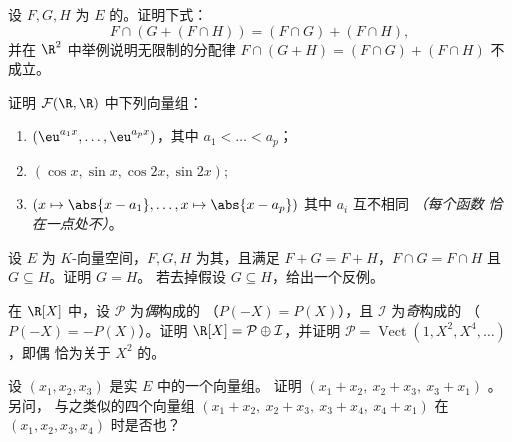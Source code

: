 \begin{exercise}[$\star\star$]\label{exo:b1:vspaces:7}
设 $F, G, H$ 为 $E$ 的。证明下式：
\[
F \cap (G + (F \cap H)) = (F \cap G) + (F \cap H),
\]
并在 $\R^2$ 中举例说明无限制的分配律
$F \cap (G + H) = (F\cap G) + (F \cap H)$ 不成立。
\end{exercise}

\begin{exercise}[$\star\star\star$]\label{exo:b1:vspaces:8}
证明 $\mathcal{F}(\R, \R)$ 中下列向量组：
\begin{enumerate}
  \item $(\eu^{a_1 x}, \dots, \eu^{a_p x})$，其中 $a_1 < \dots < a_p$；
  \item $(\cos x, \sin x, \cos 2x, \sin 2x)$;
  \item $(x \mapsto \abs{x - a_1}, \dots, x \mapsto \abs{x - a_p})$
        其中 $a_i$ 互不相同 \emph{（每个函数
        恰在一点处不）}。
\end{enumerate}
\end{exercise}

\begin{exercise}[$\star\star\star$]\label{exo:b1:vspaces:9}
设 $E$ 为 $K$-向量空间，$F, G, H$ 为其，且满足 $F + G =
F + H$，$F \cap G = F \cap H$ 且 $G \subseteq H$。证明 $G = H$。
若去掉假设 $G \subseteq H$，给出一个反例。
\end{exercise}

\begin{exercise}[$\star\star$]\label{exo:b1:vspaces:10}
在 $\R[X]$ 中，设 $\mathcal P$ 为\emph{偶}构成的
（$P(-X) = P(X)$），且 $\mathcal I$ 为\emph{奇}构成的
（$P(-X) = -P(X)$）。证明 $\R[X] = \mathcal P \oplus \mathcal
I$，并证明 $\mathcal P =
\operatorname{Vect}(1, X^2, X^4, \dots)$，即偶
恰为关于 $X^2$ 的。
\end{exercise}

\begin{exercise}[$\star\star$]\label{exo:b1:vspaces:11}
设 $(x_1, x_2, x_3)$ 是实 $E$ 中的一个向量组。
证明 $(x_1 + x_2,\ x_2 + x_3,\ x_3 + x_1)$ 。另问，
与之类似的四个向量组 $(x_1 + x_2,\ x_2 + x_3,\ x_3 +
x_4,\ x_4 + x_1)$ 在 $(x_1, x_2, x_3, x_4)$ 时是否也？
\end{exercise}

